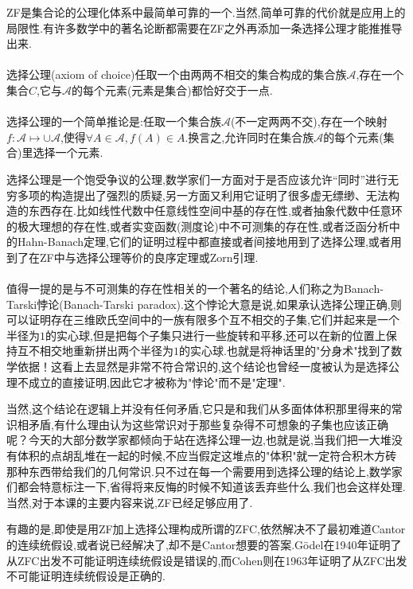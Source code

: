ZF是集合论的公理化体系中最简单可靠的一个.当然,简单可靠的代价就是应用上的局限性.有许多数学中的著名论断都需要在ZF之外再添加一条选择公理才能推推导出来.
\\ \hspace*{\fill} \\%
选择公理(axiom of choice)任取一个由两两不相交的集合构成的集合族$\mathcal{A}$,存在一个集合$C$,它与$\mathcal{A}$的每个元素(元素是集合)都恰好交于一点.
\\ \hspace*{\fill} \\%
选择公理的一个简单推论是:任取一个集合族$\mathcal{A}$(不一定两两不交),存在一个映射$f:\mathcal{A}\mapsto\cup\mathcal{A}$,使得$\forall A\in\mathcal{A},f(A)\in A$.换言之,允许同时在集合族$\mathcal{A}$的每个元素(集合)里选择一个元素.

选择公理是一个饱受争议的公理,数学家们一方面对于是否应该允许“同时”进行无穷多项的构造提出了强烈的质疑,另一方面又利用它证明了很多虚无缥缈、无法构造的东西存在.比如线性代数中任意线性空间中基的存在性,或者抽象代数中任意环的极大理想的存在性,或者实变函数(测度论)中不可测集的存在性,或者泛函分析中的Hahn-Banach定理,它们的证明过程中都直接或者间接地用到了选择公理,或者用到了在ZF中与选择公理等价的良序定理或Zorn引理.
\\ \hspace*{\fill} \\%
值得一提的是与不可测集的存在性相关的一个著名的结论,人们称之为Banach-Tarski悖论(Banach-Tarski paradox).这个悖论大意是说,如果承认选择公理正确,则可以证明存在三维欧氏空间中的一族有限多个互不相交的子集,它们并起来是一个半径为$1$的实心球,但是把每个子集只进行一些旋转和平移,还可以在新的位置上保持互不相交地重新拼出两个半径为$1$的实心球.也就是将神话里的"分身术"找到了数学依据！这看上去显然是非常不符合常识的,这个结论也曾经一度被认为是选择公理不成立的直接证明,因此它才被称为"悖论"而不是"定理".

当然,这个结论在逻辑上并没有任何矛盾,它只是和我们从多面体体积那里得来的常识相矛盾,有什么理由认为这些常识对于那些复杂得不可想象的子集也应该正确呢？今天的大部分数学家都倾向于站在选择公理一边,也就是说,当我们把一大堆没有体积的点胡乱堆在一起的时候,不应当假定这堆点的"体积"就一定符合积木方砖那种东西带给我们的几何常识.只不过在每一个需要用到选择公理的结论上,数学家们都会特意标注一下,省得将来反悔的时候不知道该丢弃些什么.我们也会这样处理.当然,对于本课的主要内容来说,ZF已经足够应用了.

有趣的是,即使是用ZF加上选择公理构成所谓的ZFC,依然解决不了最初难道Cantor的连续统假设,或者说已经解决了,却不是Cantor想要的答案.Gödel在1940年证明了从ZFC出发不可能证明连续统假设是错误的,而Cohen则在1963年证明了从ZFC出发不可能证明连续统假设是正确的.	

